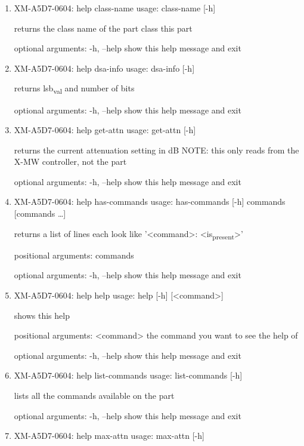 \documentclass[11pt]{article}
\begin{document}
\begin{enumerate}
\item XM-A5D7-0604: help class-name
\label{sec:org4b380ed}
usage: class-name [-h]

returns the class name of the part class this part

optional arguments:
  -h, --help  show this help message and exit

\item XM-A5D7-0604: help dsa-info
\label{sec:orgff8c7c3}
usage: dsa-info [-h]

returns lsb\textsubscript{val} and number of bits

optional arguments:
  -h, --help  show this help message and exit

\item XM-A5D7-0604: help get-attn
\label{sec:org54a36f2}
usage: get-attn [-h]

returns the current attenuation setting in dB NOTE: this only reads from the
X-MW controller, not the part

optional arguments:
  -h, --help  show this help message and exit

\item XM-A5D7-0604: help has-commands
\label{sec:orga31cc18}
usage: has-commands [-h] commands [commands \ldots{}]

returns a list of lines each look like '<command>: <is\textsubscript{present}>'

positional arguments:
  commands

optional arguments:
  -h, --help  show this help message and exit

\item XM-A5D7-0604: help help
\label{sec:orge78af1b}
usage: help [-h] [<command>]

shows this help

positional arguments:
  <command>   the command you want to see the help of

optional arguments:
  -h, --help  show this help message and exit

\item XM-A5D7-0604: help list-commands
\label{sec:org00e0a05}
usage: list-commands [-h]

lists all the commands available on the part

optional arguments:
  -h, --help  show this help message and exit

\item XM-A5D7-0604: help max-attn
\label{sec:orgd349f3a}
usage: max-attn [-h]


\end{enumerate}
\end{document}
